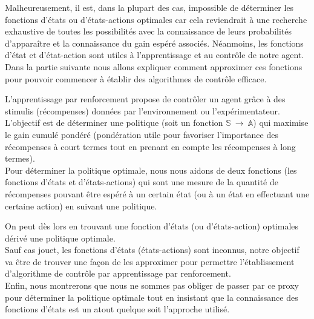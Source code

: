 Malheureusement, il est, dans la plupart des cas, impossible de déterminer les fonctions d'états ou d'états-actions optimales car cela reviendrait à une recherche exhaustive de toutes les possibilités avec la connaissance de leurs probabilités d'apparaître et la connaissance du gain espéré associés. Néanmoins, les fonctions d'état et d'état-action sont utiles à l'apprentissage et au contrôle de notre agent. Dans la partie suivante nous allons expliquer comment approximer ces fonctions pour pouvoir commencer à établir des algorithmes de contrôle efficace.
\bigskip
\begin{tcolorbox}[colback=gray!5!white,colframe=red!65!white,title=L'apprentissage par renforcement en résumé, coltitle=black, fonttitle=\bfseries]

L'apprentissage par renforcement propose de contrôler un agent grâce à des stimulis (récompenses) données par l'environnement ou l'expérimentateur. \\

L'objectif est de déterminer une politique (soit un fonction $\mathbb{S} \: \rightarrow \: \mathbb{A}$) qui maximise le gain cumulé pondéré (pondération utile pour favoriser l'importance des récompenses à court termes tout en prenant en compte les récompenses à long termes).\\ 


Pour déterminer la politique optimale, nous nous aidons de deux fonctions (les fonctions d'états et d'états-actions) qui sont une mesure de la quantité de récompenses pouvant être espéré à un certain état (ou à un état en effectuant une certaine action) en suivant une politique. 

On peut dès lors en trouvant une fonction d'états (ou d'états-action) optimales dérivé une politique optimale. \\

Sauf cas jouet, les fonctions d'états (états-actions) sont inconnus, notre objectif va être de trouver une façon de les approximer pour permettre l'établissement d'algorithme de contrôle par apprentissage par renforcement.\\


Enfin, nous montrerons que nous ne sommes pas obliger de passer par ce proxy pour déterminer la politique optimale tout en insistant que la connaissance des fonctions d'états est un atout quelque soit l'approche utilisé.
\end{tcolorbox}